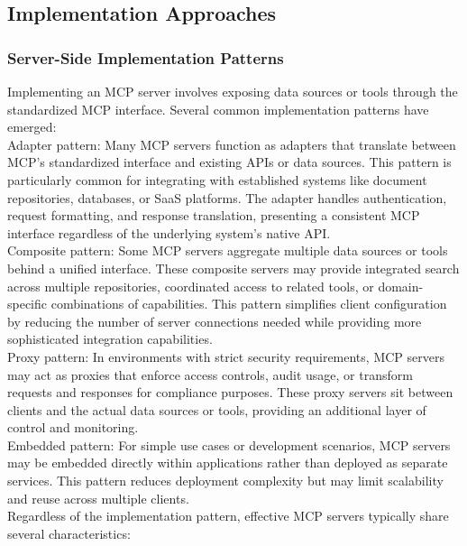 \subsection{Implementation Approaches}
\subsubsection{Server-Side Implementation Patterns}
Implementing an MCP server involves exposing data sources or tools through the standardized MCP interface. Several common implementation patterns have emerged:\\ \newline
Adapter pattern: Many MCP servers function as adapters that translate between MCP's standardized interface and existing APIs or data sources. This pattern is particularly common for integrating with established systems like document repositories, databases, or SaaS platforms. The adapter handles authentication, request formatting, and response translation, presenting a consistent MCP interface regardless of the underlying system's native API.\\ \newline
Composite pattern: Some MCP servers aggregate multiple data sources or tools behind a unified interface. These composite servers may provide integrated search across multiple repositories, coordinated access to related tools, or domain-specific combinations of capabilities. This pattern simplifies client configuration by reducing the number of server connections needed while providing more sophisticated integration capabilities.\\ \newline
Proxy pattern: In environments with strict security requirements, MCP servers may act as proxies that enforce access controls, audit usage, or transform requests and responses for compliance purposes. These proxy servers sit between clients and the actual data sources or tools, providing an additional layer of control and monitoring.\\ \newline
Embedded pattern: For simple use cases or development scenarios, MCP servers may be embedded directly within applications rather than deployed as separate services. This pattern reduces deployment complexity but may limit scalability and reuse across multiple clients.\\ \newline
Regardless of the implementation pattern, effective MCP servers typically share several characteristics:\\ \newline
